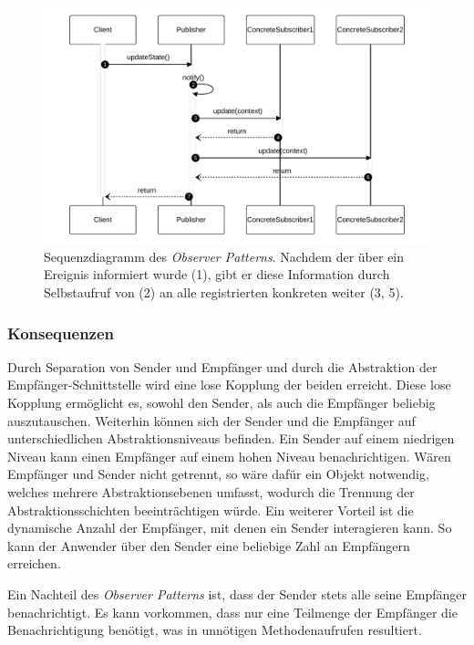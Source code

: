 \begin{figure}[!ht]
	\centering
	\includegraphics[width=0.95\linewidth]{images/patterns/observer-seq.pdf}
	\caption{Sequenzdiagramm des \emph{Observer Patterns}. Nachdem der  über ein Ereignis informiert wurde (1), gibt er diese Information durch Selbstaufruf von  (2) an alle registrierten konkreten  weiter (3, 5). \cite{skobeleva_observer_2023}}
	\label{fig:observer-seq}
\end{figure}

\subsubsection*{Konsequenzen}

Durch Separation von Sender und Empfänger und durch die Abstraktion der Empfänger-Schnittstelle wird eine lose Kopplung der beiden erreicht. Diese lose Kopplung ermöglicht es, sowohl den Sender, als auch die Empfänger beliebig auszutauschen. Weiterhin können sich der Sender und die Empfänger auf unterschiedlichen Abstraktionsniveaus befinden. Ein Sender auf einem niedrigen Niveau kann einen Empfänger auf einem hohen Niveau benachrichtigen. Wären Empfänger und Sender nicht getrennt, so wäre dafür ein Objekt notwendig, welches mehrere Abstraktionsebenen umfasst, wodurch die Trennung der Abstraktionsschichten beeinträchtigen würde. Ein weiterer Vorteil ist die dynamische Anzahl der Empfänger, mit denen ein Sender interagieren kann. So kann der Anwender über den Sender eine beliebige Zahl an Empfängern erreichen.

Ein Nachteil des \emph{Observer Patterns} ist, dass der Sender stets alle seine Empfänger benachrichtigt. Es kann vorkommen, dass nur eine Teilmenge der Empfänger die Benachrichtigung benötigt, was in unnötigen Methodenaufrufen resultiert. \cite{gamma_design_1995}
